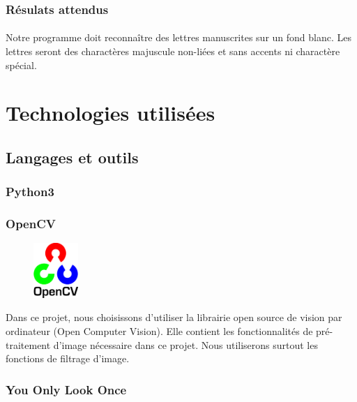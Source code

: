 \documentclass[a4paper]{article}
\begin{document}
			\subsubsection{Résulats attendus}
				\paragraph{}
					Notre programme doit reconnaître des lettres manuscrites sur un fond blanc. Les lettres seront des charactères majuscule non-liées et sans accents ni charactère spécial.
	\section{Technologies utilisées} 
		\subsection{Langages et outils}
			\subsubsection{Python3}
			\subsubsection{OpenCV}
				\begin{figure}
					\includegraphics[width=0.15\textwidth]{OpenCV.png}
				\end{figure}
				Dans ce projet, nous choisissons d'utiliser la librairie open source de vision par ordinateur (Open Computer Vision). Elle contient les fonctionnalités de pré-traitement d'image nécessaire dans ce projet. Nous utiliserons surtout les fonctions de filtrage d'image.
				\newline
			\subsubsection{You Only Look Once}
\end{document}
